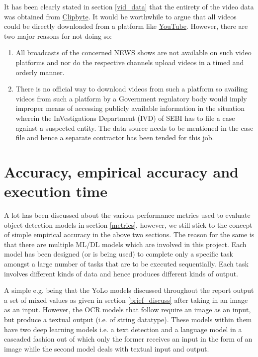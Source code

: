It has been clearly stated in section \ref{vid_data} that the entirety of the video data was obtained from \href{clipbyte.com}{Clipbyte}. It would be worthwhile to argue that all videos could be directly downloaded from a platform like \href{youtube.com}{YouTube}. However, there are two major reasons for not doing so:
\begin{enumerate}
 \item All broadcasts of the concerned NEWS shows are not available on such video platforms and nor do the respective channels upload videos in a timed and orderly manner.

 \item There is no official way to download videos from such a platform so availing videos from such a platform by a Government regulatory body would imply improper means of accessing publicly available information in the situation wherein the InVestigations Department (IVD) of SEBI has to file a case against a suspected entity. The data source needs to be mentioned in the case file and hence a separate contractor has been tended for this job.

\end{enumerate}



\section{Accuracy, empirical accuracy and execution time}

A lot has been discussed about the various performance metrics used to evaluate object detection models in section \ref{metrics}, however, we still stick to the concept of simple empirical accuracy in the above two sections. The reason for the same is that there are multiple ML/DL models which are involved in this project. Each model has been designed (or is being used) to complete only a specific task amongst a large number of tasks that are to be executed sequentially. Each task involves different kinds of data and hence produces different kinds of output. \par

A simple e.g. being that the YoLo models discussed throughout the report output a set of mixed values as given in section \ref{brief_discuss} after taking in an image as an input. However, the OCR models that follow require an image as an input, but produce a textual output (i.e. of string datatype). These models within them have two deep learning models i.e. a text detection and a language model in a cascaded fashion out of which only the former receives an input in the form of an image while the second model deals with textual input and output. \par

